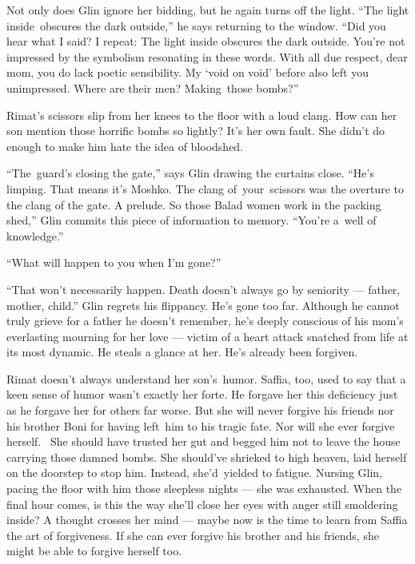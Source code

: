 \documentclass[twoside,11pt,openany]{book}
\begin{document}
{{Not only does Glin
}ignore{ her bidding, but he again turns off the light. ``The light
inside~o}bscures {the dark outside,{}'' he says returning to the
window. ``Did you hear what I said? I
repeat}{:}{ The light inside
}obscures{ the dark outside. You're not impressed by the symbolism
resonating in these words. With all due respect, }dear mom, {you do
lack poetic sensibility. My `void on void' }before also left you
unimpressed.{ Where are their men?
}Making{~those bombs?''}

Rimat's scissors slip from her knees to the floor with a loud clang. How can her son mention those horrific bombs so
lightly? It's her own fault. She didn't do enough to make him hate the idea of bloodshed.

``The~guard's closing the gate,{}'' says Glin drawing the curtains close. {}``He's limping. That means
it's Moshko. The clang of~your~scissors was the overture to the clang of the gate. A prelude. So those Balad women
work in the packing shed,{}'' Glin commits this piece of information to memory. ``You're a~well of
knowledge.''

``What will happen to you when I'm gone?''

``That won't necessarily happen. Death doesn't always go by seniority --- father, mother, child.'' Glin regrets his
flippancy. He's gone too far. Although he cannot truly grieve for a father he doesn't remember, he's deeply
conscious of his mom's everlasting mourning for her love ---  victim of a heart attack snatched from life at its
most dynamic. He steals a glance at her. He's already been forgiven.

{Rimat doesn't always understand her son's~humor. Saffia, too, used to
say that a keen sense of humor wasn't exactly her forte. }He forgave her this deficiency just as he forgave her for
others far worse. But she will never forgive his friends nor his brother Boni for having left~him to his tragic fate.
Nor will she ever forgive herself.~ She should have trusted her gut and begged him not to leave the house carrying
those damned bombs. She should've shrieked to high heaven, laid herself on the doorstep to stop him. Instead,
she'd~yielded to fatigue. Nursing Glin, pacing the floor with him those sleepless nights --- she was exhausted. When
the final hour comes, is this the way she'll close her eyes with anger still smoldering inside? A thought crosses
her mind --- maybe now is the time to learn from Saffia the art of forgiveness. If she can ever forgive his brother
and{ his friends, she might be able to forgive herself too. }

}
\end{document}
